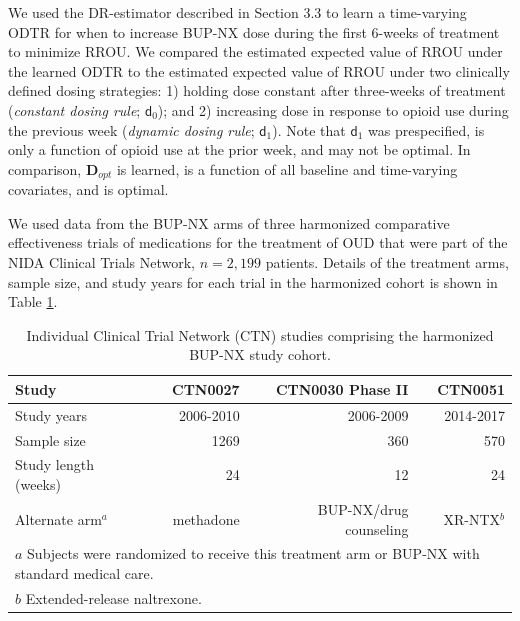 \documentclass[11pt]{article}
\renewcommand{\d}{\mathsf{d}}
\theoremstyle{example}
\begin{document}
We used the DR-estimator described in Section 3.3 to learn a time-varying ODTR for when to increase BUP-NX dose during the first 6-weeks of treatment to minimize RROU. We compared the estimated expected value of RROU under the learned ODTR to the estimated expected value of RROU under two clinically defined dosing strategies: 1) holding dose constant after three-weeks of treatment (\emph{constant dosing rule}; $\d_0$); and 2) increasing dose in response to opioid use during the previous week (\emph{dynamic dosing rule}; $\d_1$). Note that $\d_1$ was prespecified, is only a function of opioid use at the prior week, and may not be optimal. In comparison, $\mathbf{D}_{opt}$ is learned, is a function of all baseline and time-varying covariates, and is optimal.

We used data from the BUP-NX arms of three harmonized comparative effectiveness trials of medications for the treatment of OUD that were part of the NIDA Clinical Trials Network, $n = 2,199$ patients.\citep{potter2013buprenorphine,saxon2013buprenorphine,weiss2010multi,lee2018comparative} Details of the treatment arms, sample size, and study years for each trial in the harmonized cohort is shown in Table \ref{tab:t0}. 

\begin{table}[H]
\centering\footnotesize
\caption{Individual Clinical Trial Network (CTN) studies comprising the harmonized BUP-NX study cohort.}
\begin{tabular}{lrrr}
\toprule
Study &  CTN0027 & CTN0030 Phase II & CTN0051 \\
			\midrule
			Study years & 2006-2010 & 2006-2009 & 2014-2017 \\
			Sample size & 1269 & 360 & 570 \\
			Study length (weeks) & 24 & 12 & 24 \\
			Alternate arm$^a$  & methadone & BUP-NX/drug counseling & XR-NTX$^b$ \\
			\bottomrule
\multicolumn{4}{l}{\footnotesize{$a$ Subjects were randomized to receive this treatment arm or BUP-NX with standard medical care.}}\\
\multicolumn{4}{l}{\footnotesize{$b$ Extended-release naltrexone.}}\\
\end{tabular}
\label{tab:t0}
\end{table}
\end{document}

